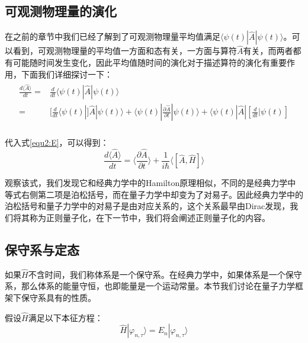     \subsection{可观测物理量的演化}\label{subsection:evolutionforoperator}
        在之前的章节中我们已经了解到了可观测物理量平均值满足$\langle\psi(t)|\hat{A}|\psi(t)\rangle$。可以看到，可观测物理量的平均值一方面和态有关，一方面与算符$\hat{A}$有关，而两者都有可能随时间发生变化，因此平均值随时间的演化对于描述算符的演化有重要作用，下面我们详细探讨一下：
        \begin{align}
            \begin{split}
                \frac{d\langle\hat{A}\rangle}{dt}=&\frac{d}{dt}\langle\psi(t)|\hat{A}|\psi(t)\rangle\\
                =&[\frac{d}{dt}\langle\psi(t)|]\hat{A}|\psi(t)\rangle+\langle\psi(t)|\frac{\partial\hat{A}}{\partial t}|\psi(t)\rangle+\langle\psi(t)|\hat{A}|[\frac{d}{dt}|\psi(t)]\\
            \end{split}
        \end{align}
        
        代入式\eqref{equ2:E}，可以得到：
        \begin{equation}\label{equ2:evolutionforoperator}
            \frac{d\langle\hat{A}\rangle}{dt}= \langle\frac{\partial\hat{A}}{\partial t}\rangle+\frac{1}{i\hbar}\langle[\hat{A},\hat{H}]\rangle
        \end{equation}
        
        观察该式，我们发现它和经典力学中的Hamilton原理相似，不同的是经典力学中等式右侧第二项是泊松括号，而在量子力学中却变为了对易子。因此经典力学中的泊松括号和量子力学中的对易子是由对应关系的，这个关系最早由Dirac发现，我们将其称为正则量子化，在下一节中，我们将会阐述正则量子化的内容。
        
        \subsection{保守系与定态}
        如果$\hat{H}$不含时间，我们称体系是一个保守系。在经典力学中，如果体系是一个保守系，那么体系的能量守恒，也即能量是一个运动常量。本节我们讨论在量子力学框架下保守系具有的性质。
        
        假设$\hat{H}$满足以下本征方程：
        \begin{equation}
            \hat{H}|\varphi_{n,\tau}\rangle=E_n|\varphi_{n,\tau}\rangle
        \end{equation}
        
